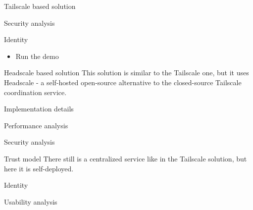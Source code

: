 \begin{block}{Tailscale based solution}
\begin{block}{Security analysis}
\begin{block}{Identity}
\begin{itemize}
  \begin{itemize}
  \tightlist
  \item
    add -P \$HOST:\$PORT for each party using their Tailscale hostname/virtual IP
  \end{itemize}
\item
  Run the demo
\end{itemize}
\end{block}
\end{block}
\end{block}

\label{thesis__080-headscale.md}
\begin{block}{Headscale based solution}
\label{thesis__080-headscale.md__headscale-based-solution}
This solution is similar to the Tailscale one, but it uses Headscale - a self-hosted open-source alternative to the closed-source Tailscale coordination service.

\begin{block}{Implementation details}
\label{thesis__080-headscale.md__implementation-details}
\end{block}

\begin{block}{Performance analysis}
\label{thesis__080-headscale.md__performance-analysis}
\end{block}

\begin{block}{Security analysis}
\label{thesis__080-headscale.md__security-analysis}
\begin{block}{Trust model}
\label{thesis__080-headscale.md__trust-model}
There still is a centralized service like in the Tailscale solution, but here it is self-deployed.
\end{block}

\begin{block}{Identity}
\label{thesis__080-headscale.md__identity}
\end{block}
\end{block}

\begin{block}{Usability analysis}
\label{thesis__080-headscale.md__usability-analysis}
\end{block}
\end{block}

